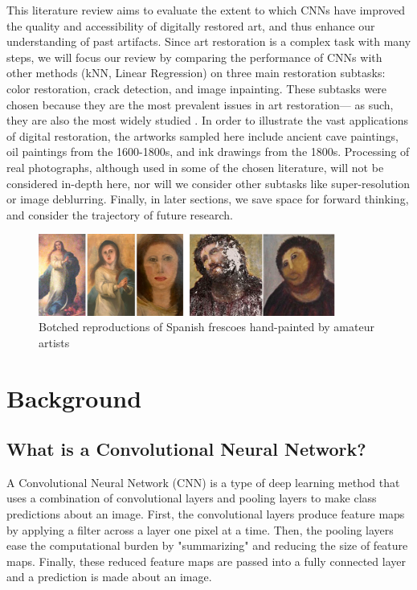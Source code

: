\documentclass[a4paper,11pt]{article}
\begin{document}
This literature review aims to evaluate the extent to which CNNs have improved the quality and accessibility of digitally restored art, and thus enhance our understanding of past artifacts. Since art restoration is a complex task with many steps, we will focus our review by comparing the performance of CNNs with other methods (kNN, Linear Regression) on three main restoration subtasks: color restoration, crack detection, and image inpainting. These subtasks were chosen because they are the most prevalent issues in art restoration— as such, they are also the most widely studied \cite{barni2005}. In order to illustrate the vast applications of digital restoration, the artworks sampled here include ancient cave paintings, oil paintings from the 1600-1800s, and ink drawings from the 1800s. Processing of real photographs, although used in some of the chosen literature, will not be considered in-depth here, nor will we consider other subtasks like super-resolution or image deblurring. Finally, in later sections, we save space for forward thinking, and consider the trajectory of future research.

\begin{figure}[h]
    \centering
    \includegraphics[width=0.87\textwidth]{botched.png}
    \caption{Botched reproductions of Spanish frescoes hand-painted by amateur artists \cite{jesus}}
\end{figure}


\section{Background}
 
\subsection{What is a Convolutional Neural Network?}

A Convolutional Neural Network (CNN) is a type of deep learning method that uses a combination of convolutional layers and pooling layers to make class predictions about an image. First, the convolutional layers produce feature maps by applying a filter across a layer one pixel at a time. Then, the pooling layers ease the computational burden by "summarizing" and reducing the size of feature maps. Finally, these reduced feature maps are passed into a fully connected layer and a prediction is made about an image. 
\end{document}
